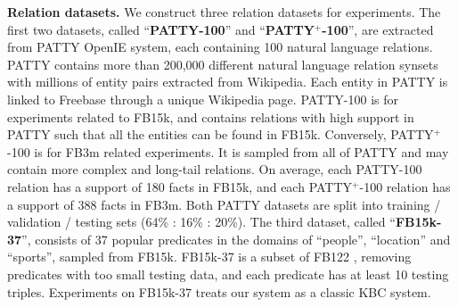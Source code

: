 \noindent
\textbf{Relation datasets.}
We construct three relation datasets for experiments.
The first two datasets, called ``\textbf{PATTY-100}'' and ``\textbf{PATTY$^+$-100}'',
are extracted from PATTY \cite{nakashole2012patty} OpenIE system, each containing
100 natural language relations.
PATTY contains more than 200,000 different natural language relation synsets
with millions of entity pairs extracted from Wikipedia.
Each entity in PATTY is linked to Freebase through a unique Wikipedia page.
PATTY-100 is for experiments related to FB15k, and contains relations with high
support in PATTY such that all the entities can be found in FB15k.
Conversely, PATTY$^+$-100 is for FB3m related experiments.
It is sampled from all of PATTY and may contain more complex and long-tail relations.
On average, each PATTY-100 relation has a support of 180 facts in
FB15k, and each PATTY$^+$-100 relation has a support of 388 facts in FB3m.
Both PATTY datasets are split into training / validation / testing sets (64\% : 16\% : 20\%).
The third dataset, called ``\textbf{FB15k-37}'', consists of 37 popular predicates
in the domains of ``people'', ``location'' and ``sports'', sampled from FB15k.
FB15k-37 is a subset of FB122 \cite{guo2016jointly},
removing predicates with too small testing data,
and each predicate has at least 10 testing triples.
Experiments on FB15k-37 treats our system as a classic KBC system.


